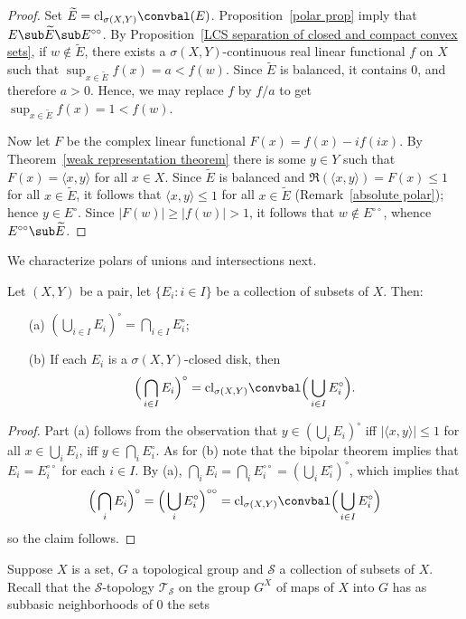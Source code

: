 \begin{proof}
Set $\widetilde{E}=\mathrm{cl}_{\sigma(X,Y)}\convbal(E)$. Proposition~\ref{polar prop} imply that $E\sub\widetilde{E}\sub E^{\circ\circ}$. By Proposition~\ref{LCS separation of closed and compact convex sets}, if $w\notin\widetilde{E}$, there exists a $\sigma(X,Y)$-continuous real linear functional $f$ on $X$ such that $\sup_{x\in\widetilde{E}}f(x)=a<f(w)$. Since $\widetilde{E}$ is balanced, it contains $0$, and therefore $a>0$. Hence, we may replace $f$ by $f/a$ to get $\sup_{x\in\widetilde{E}}f(x)=1<f(w)$.\par
Now let $F$ be the complex linear functional $F(x)=f(x)-if(ix)$. By Theorem~\ref{weak representation theorem} there is some $y\in Y$ such that $F(x)=\langle x,y\rangle$ for all $x\in X$. Since $\widetilde{E}$ is balanced and $\Re(\langle x,y\rangle)=F(x)\leq 1$ for all $x\in\widetilde{E}$, it follows that $\langle x,y\rangle\leq 1$ for all $x\in\widetilde{E}$ (Remark~\ref{absolute polar}); hence $y\in E^\circ$. Since $|F(w)|\geq|f(w)|>1$, it follows that $w\notin E^{\circ\circ}$, whence $E^{\circ\circ}\sub\widetilde{E}$.
\end{proof}
We characterize polars of unions and intersections next.
\begin{proposition}\label{polar union and intersection}
Let $(X,Y)$ be a pair, let $\{E_i:i\in I\}$ be a collection of subsets of $X$. Then:
\begin{itemize}
\item[(a)] $(\bigcup_{i\in I}E_i)^{\circ}=\bigcap_{i\in I}E_i^\circ$;
\item[(b)] If each $E_i$ is a $\sigma(X,Y)$-closed disk, then
\[\Big(\bigcap_{i\in I}E_i\Big)^\circ=\mathrm{cl}_{\sigma(X,Y)}\convbal\Big(\bigcup_{i\in I}E_i^\circ\Big).\] 
\end{itemize}
\end{proposition}
\begin{proof}
Part (a) follows from the observation that $y\in(\bigcup_iE_i)^\circ$ iff $|\langle x,y\rangle|\leq 1$ for all $x\in\bigcup_iE_i$, iff $y\in\bigcap_iE_i^\circ$. As for (b) note that the bipolar theorem implies that $E_i=E_i^{\circ\circ}$ for each $i\in I$. By (a), $\bigcap_iE_i=\bigcap_iE_i^{\circ\circ}=(\bigcup_iE_i^\circ)^\circ$, which implies that
\[\Big(\bigcap_iE_i\Big)^\circ=\Big(\bigcup_iE_i^\circ\Big)^{\circ\circ}=\mathrm{cl}_{\sigma(X,Y)}\convbal\Big(\bigcup_{i\in I}E_i^\circ\Big)\]
so the claim follows.
\end{proof}
Suppose $X$ is a set, $G$ a topological group and $\mathcal{S}$ a collection of subsets of $X$. Recall that the $\mathcal{S}$-topology $\mathcal{T}_\mathcal{S}$ on the group $G^X$ of maps of $X$ into $G$ has as subbasic neighborhoods of $0$ the sets
